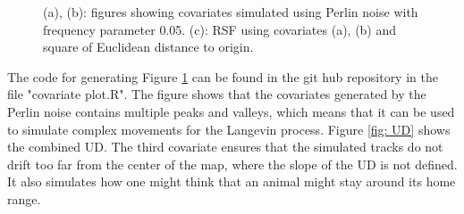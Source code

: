 \begin{figure}[H]%
    \centering
    \qquad
    \qquad
    \caption[covariate and UD plots]{(a), (b): figures showing covariates simulated using Perlin noise with frequency parameter 0.05. (c): RSF using covariates (a), (b) and square of Euclidean distance to origin.}%
    \label{fig:covariate plots}%
\end{figure}


The code for generating Figure \ref{fig:covariate plots} can be found in the git hub repository in the file "covariate plot.R". The figure shows that the covariates generated by the Perlin noise contains multiple peaks and valleys, which means that it can be used to simulate complex movements for the Langevin process. Figure \ref{fig: UD} shows the combined UD. The third covariate ensures that the simulated tracks do not drift too far from the center of the map, where the slope of the UD is not defined. It also simulates how one might think that an animal might stay around its home range. 


